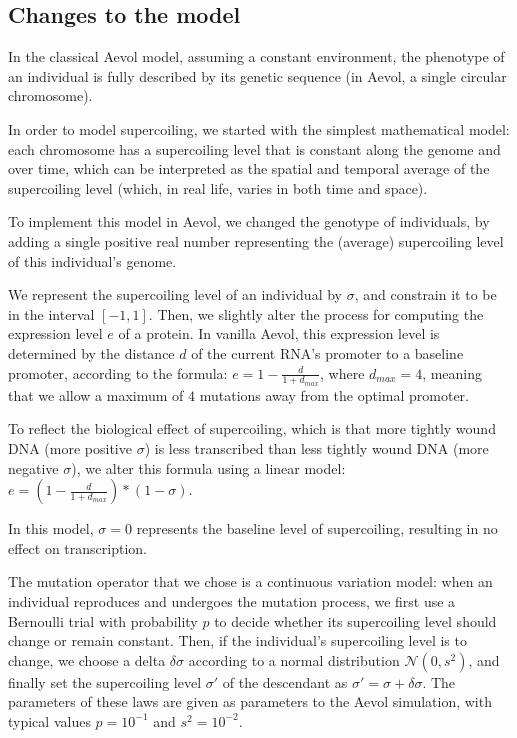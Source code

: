 \subsection{Changes to the model}

In the classical Aevol model, assuming a constant environment, the phenotype of an individual is fully described by its genetic sequence (in Aevol, a single circular chromosome).

In order to model supercoiling, we started with the simplest mathematical model: each chromosome has a supercoiling level that is constant along the genome and over time, which can be interpreted as the spatial and temporal average of the supercoiling level (which, in real life, varies in both time and space).

To implement this model in Aevol, we changed the genotype of individuals, by adding a single positive real number representing the (average) supercoiling level of this individual's genome.

We represent the supercoiling level of an individual by $\sigma$, and constrain it to be in the interval $[-1, 1]$.
Then, we slightly alter the process for computing the expression level $e$ of a protein.
In vanilla Aevol, this expression level is determined by the distance $d$ of the current RNA's promoter to a baseline promoter, according to the formula: $e = 1 - \frac{d}{1+d_{max}}$, where $d_{max} = 4$, meaning that we allow a maximum of $4$ mutations away from the optimal promoter.

To reflect the biological effect of supercoiling, which is that more tightly wound DNA (more positive $\sigma$) is less transcribed than less tightly wound DNA (more negative $\sigma$), we alter this formula using a linear model:
$e = (1 - \frac{d}{1+d_{max}}) * (1 - \sigma)$.

In this model, $\sigma = 0$ represents the baseline level of supercoiling, resulting in no effect on transcription.

The mutation operator that we chose is a continuous variation model: when an individual reproduces and undergoes the mutation process, we first use a Bernoulli trial with probability $p$ to decide whether its supercoiling level should change or remain constant.
Then, if the individual's supercoiling level is to change, we choose a delta $\delta\sigma$ according to a normal distribution $\mathcal{N}(0, s^2)$, and finally set the supercoiling level $\sigma'$ of the descendant as $\sigma' = \sigma + \delta\sigma$.
The parameters of these laws are given as parameters to the Aevol simulation, with typical values $p = 10^{-1}$ and $s^2 = 10^{-2}$.

